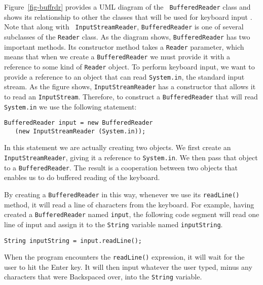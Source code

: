 Figure~\ref{fig-buffrdr} provides a UML diagram of the {\tt
BufferedReader} class and shows its relationship to other the classes
that will be used for keyboard input .  Note that along with {\tt
InputStreamReader}, {\tt BufferedReader} is one of several subclasses
of the {\tt Reader} class. As the diagram shows, {\tt BufferedReader}
has two important methods.  Its constructor method takes a {\tt Reader}
parameter, which means that when we create a {\tt BufferedReader} we
must provide it with a reference to some kind of {\tt Reader} object.
To perform keyboard input, we want to provide a reference to an
object that can read {\tt System.in}, the standard input stream. 
As the figure shows, {\tt InputStreamReader} has a constructor
that allows it to read an {\tt InputStream}. Therefore, to
construct a {\tt BufferedReader} that will read {\tt System.in}
we use the following statement:

\begin{jjjlisting}
\begin{lstlisting}
BufferedReader input = new BufferedReader
   (new InputStreamReader (System.in));
\end{lstlisting}
\end{jjjlisting}

\noindent In this statement we are actually creating two objects. 
We first create an {\tt InputStreamReader}, giving it a reference to
{\tt System.in}. We then pass that object to a {\tt BufferedReader}.
The result is a cooperation between two objects that enables us to do
buffered reading of the keyboard.

By creating a {\tt BufferedReader} in this way, whenever we use its
{\tt readLine()} method, it will read a line of characters from the
keyboard. For example, having created a {\tt BufferedReader} named
{\tt input}, the following code segment will read one line of input
and assign it to the {\tt String} variable named {\tt inputString}.

\begin{jjjlisting}
\begin{lstlisting}
String inputString = input.readLine();
\end{lstlisting}
\end{jjjlisting}

\noindent When the program encounters the {\tt readLine()} expression,
it will wait for the user to hit the Enter key. It will then input
whatever the user typed, minus any characters that were Backspaced
over, into the {\tt String} variable.


